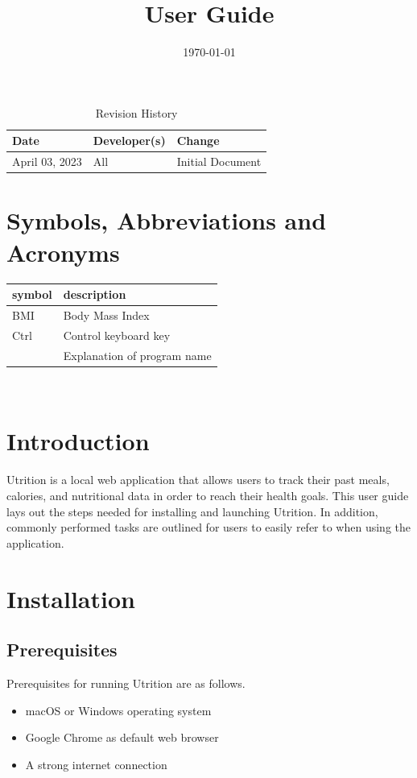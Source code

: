 \documentclass{article}
\title{User Guide\\\progname}
\author{\authname}
\date{\today}
\begin{document}
\begin{table}[hp]
\caption{Revision History} \label{TblRevisionHistory}
\begin{tabularx}{\textwidth}{llX}
\toprule
\textbf{Date} & \textbf{Developer(s)} & \textbf{Change}\\
\midrule
April 03, 2023 & All & Initial Document\\
\bottomrule
\end{tabularx}
\end{table}

\newpage

\maketitle
\newpage
\tableofcontents
\listoffigures
\newpage

\section{Symbols, Abbreviations and Acronyms}

\renewcommand{\arraystretch}{1.2}
\begin{tabular}{l l} 
	\toprule		
	\textbf{symbol} & \textbf{description}\\
	\midrule 
	BMI & Body Mass Index\\
	Ctrl & Control keyboard key\\
	\progname & Explanation of program name\\
	\bottomrule
\end{tabular}\\

\section{Introduction}

Utrition is a local web application that allows users to track their past meals, calories, and nutritional data in order to reach their health goals. This user guide lays out the steps needed for installing and launching Utrition. In addition, commonly performed tasks are outlined for users to easily refer to when using the application.

\section{Installation}
\subsection{Prerequisites}
Prerequisites for running Utrition are as follows.
\begin{itemize}
	\item macOS or Windows operating system
	\item Google Chrome as default web browser
	\item A strong internet connection
\end{itemize}
\end{document}
